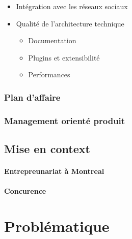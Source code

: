 \documentclass[11pt, a4paper ]{report}
\begin{document}
\begin{itemize}
	\item Intégration avec les réseaux sociaux 

	\item Qualité de l'architecture technique 
		\begin{itemize}
			\item Documentation

			\item Plugins et extensibilité

			\item Performances 

		\end{itemize}

\end{itemize}




			\subsection{Plan d'affaire}



			\subsection{Management orienté produit}


		\section{Mise en context} %


			\subsubsection{Entrepreunariat à Montreal}

			\subsubsection{Concurence}


	\chapter{Problématique} %
\end{document}
